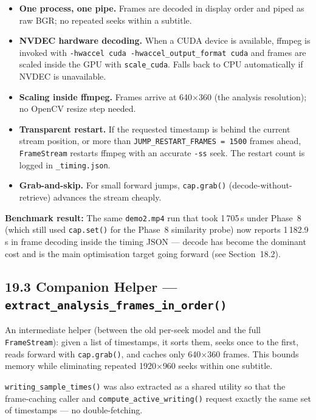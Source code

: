 \documentclass[11pt]{article}
\begin{document}
\begin{itemize}[leftmargin=1.2em]
  \item \textbf{One process, one pipe.}  Frames are decoded in display order and
        piped as raw BGR; no repeated seeks within a subtitle.
  \item \textbf{NVDEC hardware decoding.}  When a CUDA device is available,
        ffmpeg is invoked with \texttt{-hwaccel cuda -hwaccel\_output\_format cuda}
        and frames are scaled inside the GPU with \texttt{scale\_cuda}.  Falls back
        to CPU automatically if NVDEC is unavailable.
  \item \textbf{Scaling inside ffmpeg.}  Frames arrive at 640$\times$360 (the
        analysis resolution); no OpenCV resize step needed.
  \item \textbf{Transparent restart.}  If the requested timestamp is behind the
        current stream position, or more than \texttt{JUMP\_RESTART\_FRAMES = 1500}
        frames ahead, \texttt{FrameStream} restarts ffmpeg with an accurate
        \texttt{-ss} seek.  The restart count is logged in \texttt{\_timing.json}.
  \item \textbf{Grab-and-skip.}  For small forward jumps, \texttt{cap.grab()}
        (decode-without-retrieve) advances the stream cheaply.
\end{itemize}

\textbf{Benchmark result:} The same \texttt{demo2.mp4} run that took 1\,705\,s
under Phase~8 (which still used \texttt{cap.set()} for the Phase~8 similarity probe)
now reports 1\,182.9\,s in frame decoding inside the timing JSON --- decode has
become the dominant cost and is the main optimisation target going forward (see
Section~18.2).

\subsection*{19.3 Companion Helper --- \texttt{extract\_analysis\_frames\_in\_order()}}

An intermediate helper (between the old per-seek model and the full
\texttt{FrameStream}): given a list of timestamps, it sorts them, seeks once to
the first, reads forward with \texttt{cap.grab()}, and caches only
640$\times$360 frames.  This bounds memory while eliminating repeated
1920$\times$960 seeks within one subtitle.

\texttt{writing\_sample\_times()} was also extracted as a shared utility so that
the frame-caching caller and \texttt{compute\_active\_writing()} request exactly
the same set of timestamps --- no double-fetching.
\end{document}

